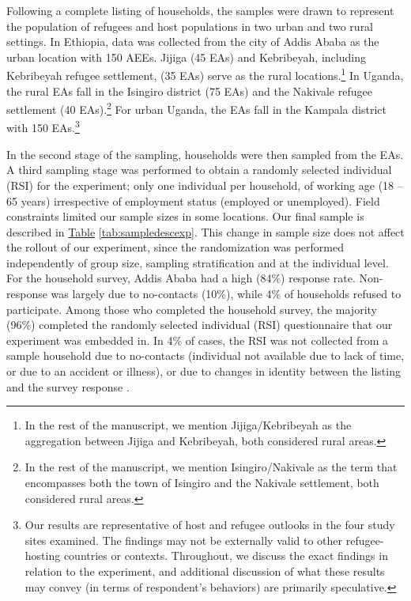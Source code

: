 \documentclass[a4paper,12pt]{article}
\begin{document}
\begin{appendix}
Following a complete listing of households, the samples were drawn to represent the population of refugees and host populations in two urban and two rural settings. In Ethiopia, data was collected from the city of Addis Ababa as the urban location with 150 AEEs. Jijiga (45 EAs) and Kebribeyah, including Kebribeyah refugee settlement, (35 EAs) serve as the rural locations.\footnote{In the rest of the manuscript, we mention Jijiga/Kebribeyah as the aggregation between Jijiga and Kebribeyah, both considered rural areas.} In Uganda, the rural EAs fall in the Isingiro district (75 EAs) and the Nakivale refugee settlement (40 EAs).\footnote{In the rest of the manuscript, we mention Isingiro/Nakivale as the term that encompasses both the town of Isingiro and the Nakivale settlement, both considered rural areas.} For urban Uganda, the EAs fall in the Kampala district with 150 EAs.\footnote{Our results are representative of host and refugee outlooks in the four study sites examined. The findings may not be externally valid to other refugee-hosting countries or contexts. Throughout, we discuss the exact findings in relation to the experiment, and additional discussion of what these results may convey (in terms of respondent's behaviors) are primarily speculative.} 

In the second stage of the sampling, households were then sampled from the EAs. A third sampling stage was performed to obtain a randomly selected individual (RSI) for the experiment; only one individual per household, of working age (18 – 65 years) irrespective of employment status (employed or unemployed). Field constraints limited our sample sizes in some locations. Our final sample is described in  \hyperref[tab:sampledescexp]{Table} \ref{tab:sampledescexp}. This change in sample size does not affect the rollout of our experiment, since the randomization was performed independently of group size, sampling stratification and at the individual level. \\ 


For the household survey, Addis Ababa had a high (84\%) response rate. Non-response was largely due to no-contacts (10\%), while 4\% of households refused to participate. Among those who completed the household survey, the majority (96\%) completed the randomly selected individual (RSI) questionnaire that our experiment was embedded in. In 4\% of cases, the RSI was not collected from a sample household due to no-contacts (individual not available due to lack of time, or due to an accident or illness), or due to changes in identity between the listing and the survey response \citep{fafo2025}. 


\end{appendix}
\end{document}
